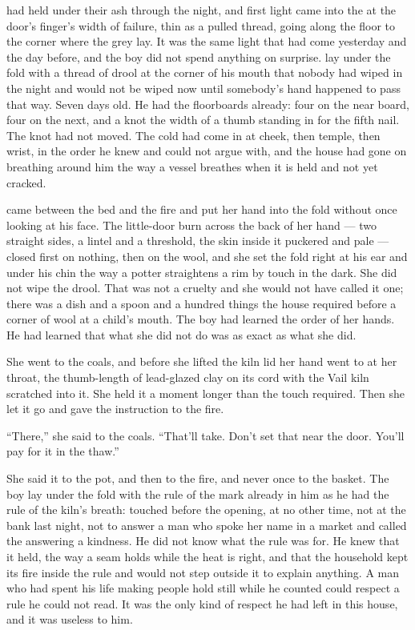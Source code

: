 
 had held under their ash through the night, and first light came into the  at the door's finger's width of failure, thin as a pulled thread, going along the floor to the corner where the grey lay. It was the same light that had come yesterday and the day before, and the boy did not spend anything on surprise.  lay under the fold with a thread of drool at the corner of his mouth that nobody had wiped in the night and would not be wiped now until somebody's hand happened to pass that way. Seven days old. He had the floorboards already: four on the near board, four on the next, and a knot the width of a thumb standing in for the fifth nail. The knot had not moved. The cold had come in at cheek, then temple, then wrist, in the order he knew and could not argue with, and the house had gone on breathing around him the way a vessel breathes when it is held and not yet cracked.

 came between the bed and the fire and put her hand into the fold without once looking at his face. The little-door burn across the back of her hand --- two straight sides, a lintel and a threshold, the skin inside it puckered and pale --- closed first on nothing, then on the wool, and she set the fold right at his ear and under his chin the way a potter straightens a rim by touch in the dark. She did not wipe the drool. That was not a cruelty and she would not have called it one; there was a dish and a spoon and a hundred things the house required before a corner of wool at a child's mouth. The boy had learned the order of her hands. He had learned that what she did not do was as exact as what she did.

She went to the coals, and before she lifted the kiln lid her hand went to  at her throat, the thumb-length of lead-glazed clay on its cord with the Vail kiln scratched into it. She held it a moment longer than the touch required. Then she let it go and gave the instruction to the fire.

“There,” she said to the coals. “That'll take. Don't set that near the door. You'll pay for it in the thaw.”

She said it to the pot, and then to the fire, and never once to the basket. The boy lay under the fold with the rule of the mark already in him as he had the rule of the kiln's breath: touched before the opening, at no other time, not at the bank last night, not to answer a man who spoke her name in a market and called the answering a kindness. He did not know what the rule was for. He knew that it held, the way a seam holds while the heat is right, and that the household kept its fire inside the rule and would not step outside it to explain anything. A man who had spent his life making people hold still while he counted could respect a rule he could not read. It was the only kind of respect he had left in this house, and it was useless to him.

